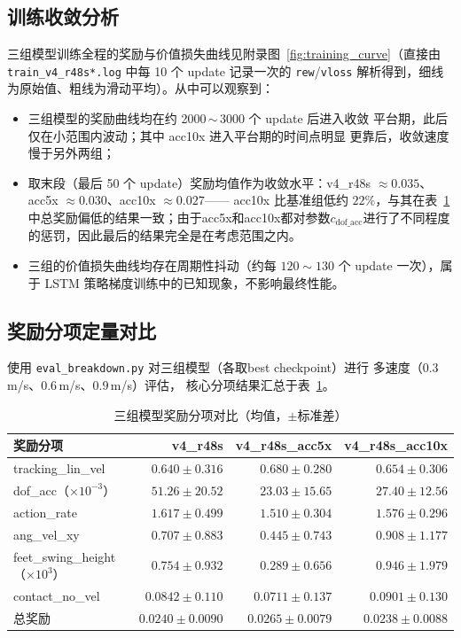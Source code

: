 \documentclass[12pt, a4paper]{article}
\begin{document}
\subsection{训练收敛分析}

三组模型训练全程的奖励与价值损失曲线见附录图~\ref{fig:training_curve}（直接由
\texttt{train\_v4\_r48s*.log} 中每 10 个 update 记录一次的 \texttt{rew}/\texttt{vloss}
解析得到，细线为原始值、粗线为滑动平均）。从中可以观察到：

\begin{itemize}
    \item 三组模型的奖励曲线均在约 2000\,$\sim$\,3000 个 update 后进入收敛
          平台期，此后仅在小范围内波动；其中 acc10x 进入平台期的时间点明显
          更靠后，收敛速度慢于另外两组；
    \item 取末段（最后 50 个 update）奖励均值作为收敛水平：v4\_r48s
          $\approx 0.035$、acc5x $\approx 0.030$、acc10x $\approx 0.027$——
          acc10x 比基准组低约 $22\%$，与其在表~\ref{tab:eval_breakdown}中总奖励偏低的结果一致；由于acc5x和acc10x都对参数$c_\text{dof\_acc}$进行了不同程度的惩罚，因此最后的结果完全是在考虑范围之内。
    \item 三组的价值损失曲线均存在周期性抖动（约每 $120\sim130$ 个 update
          一次），属于 LSTM 策略梯度训练中的已知现象，不影响最终性能。
\end{itemize}

\subsection{奖励分项定量对比}

使用 \texttt{eval\_breakdown.py} 对三组模型（各取best checkpoint）进行
多速度（$0.3$\,m/s、$0.6$\,m/s、$0.9$\,m/s）评估，
核心分项结果汇总于表~\ref{tab:eval_breakdown}。

\begin{table}[H]
\centering
\caption{三组模型奖励分项对比（均值，$\pm$标准差）}
\label{tab:eval_breakdown}
\begin{tabular}{lrrr}
\toprule
奖励分项 & v4\_r48s & v4\_r48s\_acc5x & v4\_r48s\_acc10x \\
\midrule
tracking\_lin\_vel & $0.640\pm0.316$ & $0.680\pm0.280$ & $0.654\pm0.306$ \\
dof\_acc（×$10^{-3}$） & $51.26\pm20.52$ & $23.03\pm15.65$ & $27.40\pm12.56$ \\
action\_rate & $1.617\pm0.499$ & $1.510\pm0.304$ & $1.576\pm0.296$ \\
ang\_vel\_xy & $0.707\pm0.883$ & $0.445\pm0.743$ & $0.908\pm1.177$ \\
feet\_swing\_height（×$10^{3}$） & $0.754\pm0.932$ & $0.289\pm0.656$ & $0.946\pm1.979$ \\
contact\_no\_vel & $0.0842\pm0.110$ & $0.0711\pm0.137$ & $0.0901\pm0.130$ \\
\midrule
总奖励 & $0.0240\pm0.0090$ & $0.0265\pm0.0079$ & $0.0238\pm0.0088$ \\
\bottomrule
\end{tabular}
\end{table}
\end{document}
